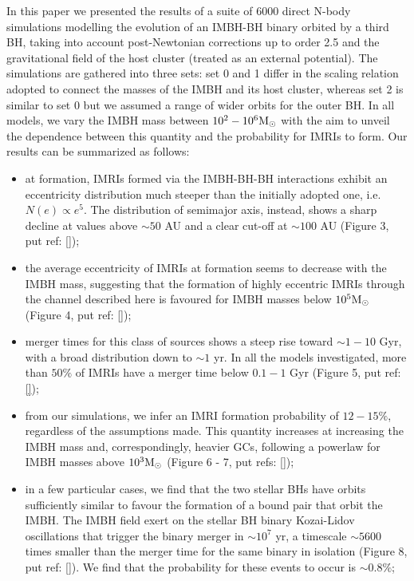 \documentclass[twocolumn]{aastex62}
\newcommand{\Ms}{{\rm M}_\odot}
\begin{document}
In this paper we presented the results of a suite of 6000 direct N-body simulations modelling the evolution of an IMBH-BH binary orbited by a third BH, taking into account post-Newtonian corrections up to order 2.5 and the gravitational field of the host cluster (treated as an external potential). The simulations are gathered into three sets: set 0 and 1 differ in the scaling relation adopted to connect the masses of the IMBH and its host cluster, whereas set 2 is similar to set 0 but we assumed a range of wider orbits for the outer BH. In all models, we vary the IMBH mass between $10^2-10^6\Ms$ with the aim to unveil the dependence between this quantity and the probability for IMRIs to form.
Our results can be summarized as follows:
\begin{itemize}
\item at formation, IMRIs formed via the IMBH-BH-BH interactions exhibit an eccentricity distribution much steeper than the initially adopted one, i.e. $N(e) \propto e^5$. The distribution of semimajor axis, instead, shows a sharp decline at values above $\sim 50$ AU and a clear cut-off at $\sim 100$ AU (Figure 3, put ref: \ref{});
\item the average eccentricity of IMRIs at formation seems to decrease with the IMBH mass, suggesting that the formation of highly eccentric IMRIs through the channel described here is favoured for IMBH masses below $10^5\Ms$ (Figure 4, put ref: \ref{});
\item merger times for this class of sources shows a steep rise toward $\sim 1-10$ Gyr, with a broad 
distribution down to $\sim 1$ yr. In all the models investigated, more than $50\%$ of IMRIs have a merger time below $0.1-1$ Gyr (Figure 5, put ref: \ref{});
\item from our simulations, we infer an IMRI formation probability of $12-15\%$, regardless of the assumptions made. This quantity increases at increasing the IMBH mass and, correspondingly, heavier GCs, following a powerlaw for IMBH masses above $10^3\Ms$ (Figure 6 - 7, put refs: \ref{});
\item in a few particular cases, we find that the two stellar BHs have orbits sufficiently similar to favour the formation of a bound pair that orbit the IMBH. The IMBH field exert on the stellar BH binary Kozai-Lidov oscillations that trigger the binary merger in $\sim 10^7$ yr, a timescale $\sim 5600$ times smaller than the merger time for the same binary in isolation (Figure 8, put ref: \ref{}). We find that the probability for these events to occur is $\sim 0.8\%$; 

\end{itemize}
\end{document}
